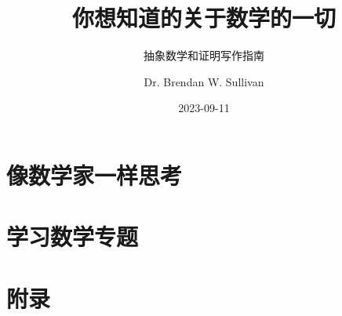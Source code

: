 \documentclass[lang=cn,color=green,10pt]{elegantbook}
\title{你想知道的关于数学的一切}
\subtitle{抽象数学和证明写作指南}
\author{Dr. Brendan W. Sullivan}
\date{2023-09-11}
\begin{document}
\maketitle
\frontmatter

\tableofcontents

\mainmatter

\part{像数学家一样思考}\label{part:Part One}








\part{学习数学专题}\label{part:Part Two}





\appendix

\part{附录}\label{part:Appendix}




\end{document}
